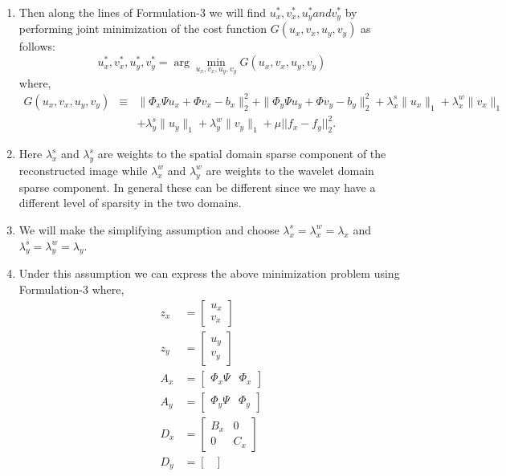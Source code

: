 \begin{enumerate}
\item Then along the lines of Formulation-3 we will find $u_x^*, v_x^*, u_y^* and v_y^*$ by performing joint minimization of the cost function $G(u_x, v_x, u_y, v_y)$ as follows:
 \begin{equation}
u_x^*, v_x^*, u_y^*, v_y^* = \arg \min_{u_x, v_x, u_y, v_y} G(u_x, v_x, u_y, v_y)
 \end{equation}
where,
 \begin{eqnarray}
G(u_x, v_x, u_y, v_y) &\equiv& \|\Phi_x\Psi u_x + \Phi v_x - b_x\|_2^2 + \|\Phi_y\Psi u_y +\Phi v_y  - b_y\|_2^2 + \lambda^s_x \|u_x\|_1 + \lambda^w_x \|v_x\|_1 \nonumber \\
& & +  \lambda^s_y \|u_y\|_1 + \lambda^w_y \|v_y\|_1   + \mu ||f_x - f_y||_2^2.
\label{eq:cstf}
 \end{eqnarray}
\item Here $\lambda^s_x$ and $\lambda^s_y$ are weights to the spatial domain sparse component of the reconstructed image while $\lambda^w_x$ and $\lambda^w_y$ are weights to the wavelet domain sparse component. In general these can be different since we may have a different level of sparsity in the two domains.
\item We will make the simplifying assumption and choose $\lambda^s_x = \lambda^w_x = \lambda_x$ and $\lambda^s_y = \lambda^w_y = \lambda_y$.
\item Under this assumption we can express the above minimization problem using Formulation-3 where,
\begin{align}
z_x &= \begin{bmatrix}
u_x \\
v_x
\end{bmatrix}\\
z_y &= \begin{bmatrix}
u_y \\
v_y
\end{bmatrix}\\
A_x &= \begin{bmatrix}
\Phi_x\Psi &  \Phi_x
\end{bmatrix}\\
A_y &= \begin{bmatrix}
\Phi_y\Psi &  \Phi_y
\end{bmatrix}\\
D_x &= \begin{bmatrix}
B_x &  0 \\
0 & C_x
\end{bmatrix}\\
D_y &= \begin{bmatrix}

\end{bmatrix}
\end{align}
\end{enumerate}
